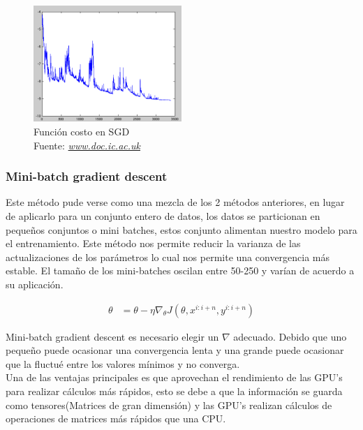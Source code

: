 \begin{figure}[H]
	\centering
	\includegraphics[width=0.5\textwidth]{Figures/sgd.png}
	\caption{Función costo en SGD \\ Fuente:  \href{https://www.doc.ic.ac.uk/~js4416/163/website/neural-networks/optimisers.html}{\textit{www.doc.ic.ac.uk}}}
	\label{funcion costo}
\end{figure} 

\subsubsection{Mini-batch gradient descent}
Este método pude verse como una mezcla de los 2 métodos anteriores, en lugar de aplicarlo para un conjunto entero de datos, los datos se particionan en pequeños conjuntos o mini batches, estos conjunto alimentan nuestro modelo para el entrenamiento.			
Este método nos permite reducir la varianza de las actualizaciones de los parámetros lo cual nos permite una convergencia más estable. El tamaño de los mini-batches oscilan entre 50-250 y varían de acuerdo a su aplicación.

\begin{equation}
\label{mbgds}
\begin{aligned}
\theta &= \theta - \eta \nabla_{\theta} J(\theta,x^{i:i+n},y^{i:i+n})
\end{aligned}
\end{equation}

Mini-batch gradient descent es necesario elegir un $\nabla$ adecuado. Debido  que uno pequeño puede ocasionar una convergencia lenta y una grande puede ocasionar que la fluctué entre los valores mínimos y no converga.\\
Una de las ventajas principales es que aprovechan el rendimiento de las GPU's para realizar cálculos más rápidos, esto se debe a que la información se guarda como tensores(Matrices de gran dimensión) y las GPU's realizan cálculos de operaciones de matrices más rápidos que una CPU.

